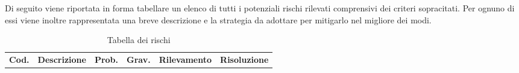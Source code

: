 Di seguito viene riportata in forma tabellare un elenco di tutti i potenziali rischi rilevati comprensivi dei criteri sopracitati. Per ognuno di essi viene inoltre rappresentata una breve descrizione e la strategia da adottare per mitigarlo nel migliore dei modi.
{
        \renewcommand{\arraystretch}{1.5}
        
        \begin{longtable}{|p{0.8cm}|p{3cm}|p{1cm}|p{1cm}|p{3cm}|p{3.2cm}|}
        \caption{Tabella dei rischi}\\
        \rowcolor{\primaryColor}
        \textcolor{\secondaryColor}{\textbf{Cod.}} & 
        \textcolor{\secondaryColor}{\textbf{Descrizione}} & 
        \textcolor{\secondaryColor}{\textbf{Prob.}} & 
        \textcolor{\secondaryColor}{\textbf{Grav.}} & 
        \textcolor{\secondaryColor}{\textbf{Rilevamento}} &
        \textcolor{\secondaryColor}{\textbf{Risoluzione}}\\
       

\end{longtable}}
